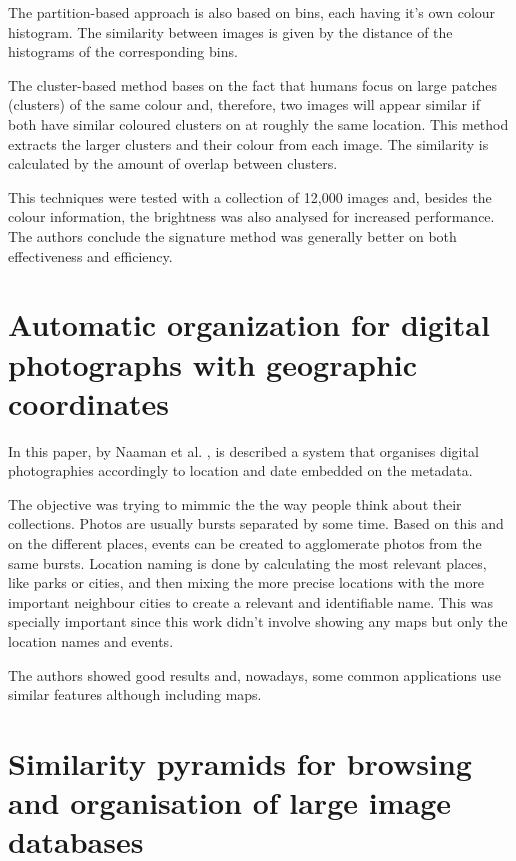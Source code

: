 The partition-based approach is also based on bins, each having it's own colour histogram. The similarity between images is given by the distance of the histograms of the corresponding bins.

The cluster-based method bases on the fact that humans focus on large patches (clusters) of the same colour and, therefore, two images will appear similar if both have similar coloured clusters on at roughly the same location. This method extracts the larger clusters and their colour from each image. The similarity is calculated by the amount of overlap between clusters.

This techniques were tested with a collection of 12,000 images and, besides the colour information, the brightness was also analysed for increased performance. The authors conclude the signature method was generally better on both effectiveness and efficiency.


\section{Automatic organization for digital photographs with geographic coordinates} %
\label{sub:Naaman}

In this paper, by Naaman et al. \cite{Naaman:2004p1802}, is described a system that organises digital photographies accordingly to location and date embedded on the metadata.

The objective was trying to mimmic the the way people think about their collections. Photos are usually bursts separated by some time. Based on this and on the different places, events can be created to agglomerate photos from the same bursts. Location naming is done by calculating the most relevant places, like parks or cities, and then mixing the more precise locations with the more important neighbour cities to create a relevant and identifiable name. This was specially important since this work didn't involve showing any maps but only the location names and events.

The authors showed good results and, nowadays, some common applications use similar features although including maps.

\section{Similarity pyramids for browsing and organisation of large image databases} %
\label{sub:Chen}

